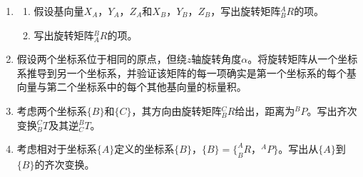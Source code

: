 \begin{enumerate}
\item 
	\begin{enumerate}
	 \item 假设基向量$X_A$，$Y_A$，$Z_A$和$X_B$，$Y_B$，$Z_B$，写出旋转矩阵$^A_BR$的项。
	 \item 写出旋转矩阵$^B_AR$的项。
	 \end{enumerate} 

\item 假设两个坐标系位于相同的原点，但绕$z$轴旋转角度$\alpha$。将旋转矩阵从一个坐标系推导到另一个坐标系，并验证该矩阵的每一项确实是第一个坐标系的每个基向量与第二个坐标系中的每个其他基向量的标量积。
\item 考虑两个坐标系$\{B\}$和$\{C\}$，其方向由旋转矩阵$^C_BR$给出，距离为$^BP$。写出齐次变换$^C_BT$及其逆$^B_CT$。
\item 考虑相对于坐标系$\{A\}$定义的坐标系$\{B\}$，$\{B\}=\{^A_BR，^AP\}$。写出从$\{A\}$到$\{B\}$的齐次变换。
\end{enumerate}


